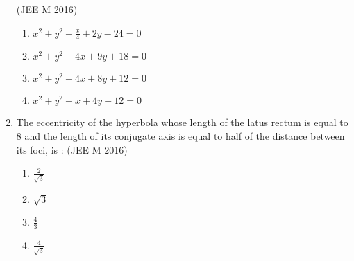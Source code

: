\documentclass[journal,12pt,twocolumn]{IEEEtran}
\theoremstyle{remark}
\begin{document}
\begin{enumerate}
\hfill(JEE M 2016)
\begin{enumerate}
    \item $x^2+y^2-\frac{x}{4}+2y-24=0$ 
    \item $x^2+y^2-4x+9y+18=0$ 
    \item $x^2+y^2-4x+8y+12=0$
    \item $x^2+y^2-x+4y-12=0$
\end{enumerate}
\item The eccentricity of the hyperbola whose length of the latus rectum is equal to $8$ and the length of its conjugate axis is equal to half of the distance between its foci, is : 
\hfill(JEE M 2016)
\begin{enumerate}
    \item $\frac{2}{\sqrt{3}}$
    \item $\sqrt{3}$
    \item $\frac{4}{3}$
    \item $\frac{4}{\sqrt{3}}$
\end{enumerate}
\end{enumerate}
\end{document}
